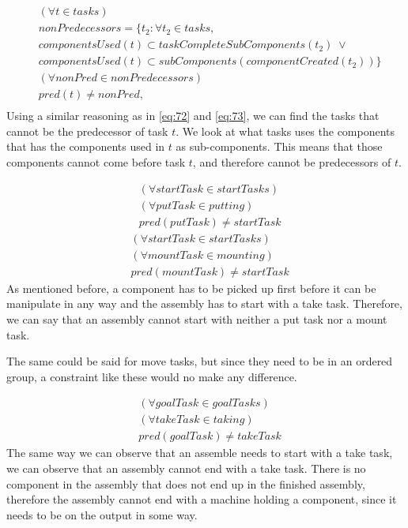   \begin{equation}
  \begin{aligned}\label{eq:78}
  &(\forall t \in tasks)\\
  &nonPredecessors = \{t_2 : \forall t_2 \in tasks, \\
  &componentsUsed(t) \subset taskCompleteSubComponents(t_2) \; \lor \\
  &componentsUsed(t) \subset subComponents(componentCreated(t_2))\} \\
  &(\forall nonPred \in nonPredecessors) \\
  &pred(t) \neq nonPred, \\
  \end{aligned}
  \end{equation}
  Using a similar reasoning as in \ref{eq:72} and \ref{eq:73}, we can find the tasks that cannot be the predecessor of task $t$. We look at what tasks uses the components that has the components used in $t$ as sub-components. This means that those components cannot come before task $t$, and therefore cannot be predecessors of $t$.
  
  \begin{equation}\label{eq:79}
  \begin{aligned}
  &(\forall startTask \in startTasks)\\
  &(\forall putTask \in putting)\\
  &pred(putTask) \neq startTask
  \end{aligned}
  \end{equation}
  \begin{equation}\label{eq:80}
   \begin{aligned}
   &(\forall startTask \in startTasks)\\
   &(\forall mountTask \in mounting)\\
   &pred(mountTask) \neq startTask 
   \end{aligned}
  \end{equation}
  As mentioned before, a component has to be picked up first before it can be manipulate in any way and the assembly has to start with a take task. Therefore, we can say that an assembly cannot start with neither a put task nor a mount task.
  
  The same could be said for move tasks, but since they need to be in an ordered group, a constraint like these would no make any difference.
  
  \begin{equation}\label{eq:81}
  \begin{aligned}
  &(\forall goalTask \in goalTasks) \\
  &(\forall takeTask \in taking) \\
  &pred(goalTask) \neq takeTask
  \end{aligned}
  \end{equation}
  The same way we can observe that an assemble needs to start with a take task, we can observe that an assembly cannot end with a take task. There is no component in the assembly that does not end up in the finished assembly, therefore the assembly cannot end with a machine holding a component, since it needs to be on the output in some way. 
  
